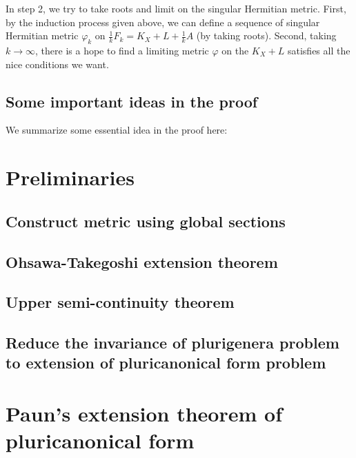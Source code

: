 \documentclass[11pt]{article}
\theoremstyle{definition}
\begin{document}
	In step 2, we try to take roots and limit on the singular Hermitian metric. First, by the induction process given above, we can define a sequence of singular Hermitian metric $\varphi_k$ on $\frac{1}{k}F_k= K_X+L+ \frac{1}{k} A$ (by taking roots). Second, taking $k\to \infty$, there is a hope to find a limiting metric $\varphi$ on the $K_X+L$ satisfies all the nice conditions we want. 
	\subsection{Some important ideas in the proof}
	We summarize some essential idea in the proof here: 
	\section{Preliminaries}
	\subsection{Construct metric using global sections}
	
	\subsection{Ohsawa-Takegoshi extension theorem}
	
	\subsection{Upper semi-continuity theorem}
	
	\subsection{Reduce the invariance of plurigenera problem to extension of pluricanonical form problem}
	
	\section{Paun's extension theorem of pluricanonical form}
	
\end{document}
